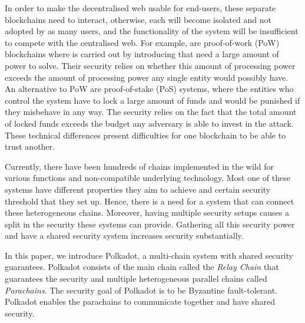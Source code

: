 In order to make the decentralised web usable for end-users, these separate blockchains need to interact, otherwise, each will become isolated and not adopted by as many users, and the  functionality of the system will be insufficient to compete with the centralised web.  For example,  are proof-of-work (PoW) blockchains where  is carried out by introducing  that need a large amount of  power to solve. Their security relies on whether this amount of processing power exceeds the amount of processing power any single entity would possibly have. An alternative to PoW are proof-of-stake (PoS) systems, where the entities who control the system have to lock a large amount of funds and would be punished if they misbehave in any way.
The security relies on the fact that the total amount of locked funds exceeds the budget any adversary is able to invest in the attack.
These technical differences present difficulties for one blockchain to be able to trust another.

Currently, there have been hundreds of chains implemented in the wild for various functions and non-compatible underlying technology.
Most one of these systems have different properties they aim to achieve and certain security threshold that they set up.
Hence, there is a need for a system that can connect these heterogeneous chains.
Moreover, having multiple security setups causes a split in the security these systems can provide. Gathering all this security power and have a shared security system increases security substantially.

In this paper, we introduce Polkadot, a multi-chain system with shared security guarantees.
Polkadot consists of the main chain called the \emph{Relay Chain} that guarantees the security and multiple heterogeneous parallel chains called \emph{Parachains}.
The security goal of Polkadot is to be Byzantine fault-tolerant. Polkadot enables the parachains to communicate together and have shared security.

